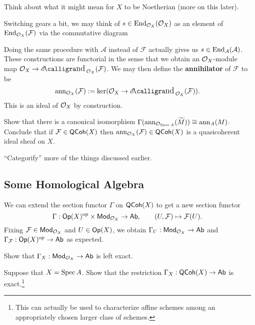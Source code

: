 \documentclass[11pt]{article}
\renewcommand{\AA}{\mathcal{A}}
\renewcommand{\F}{\mathcal{F}}
\begin{document}
\begin{exercise}
Think about what it might mean for $X$ to be Noetherian (more on this later).
\end{exercise}

Switching gears a bit, we may think of $s\in\operatorname{End}_{\mathcal{O}_X}(\mathcal{O}_X)$ as an element of $\End_{\O_X}(\F)$ via the commutative diagram
\begin{center}
\end{center}
Doing the same procedure with $\AA$ instead of $\F$ actually gives us $s\in\End_{\AA}(\AA)$. These constructions are functorial in the sense that we obtain an $\mathcal{O}_X$-module map $\O_X\to\EEnd_{\O_X}(\F)$. We may then define the \textbf{annihilator} of $\F$ to be
$$\ann_{\O_X}(\F):=\ker(\O_X\to\EEnd_{\O_X}(\F)).$$
This is an ideal of $\mathcal{O}_X$ by construction.

\begin{exercise}
Show that there is a canonical isomorphism $\Gamma(\operatorname{ann}_{\mathcal{O}_{\operatorname{Spec} A}}(\widetilde{M}))\cong\operatorname{ann}_A(M)$. Conclude that if $\F\in\QCoh(X)$ then $\ann_{\O_X}(\F)\in\QCoh(X)$ is a quasicoherent ideal sheaf on $X$.
\end{exercise}

\begin{exercise}
``Categorify'' more of the things discussed earlier.
\end{exercise}

\subsection{Some Homological Algebra}
We can extend the section functor $\Gamma$ on $\operatorname{\mathsf{QCoh}}(X)$ to get a new section functor
$$\Gamma: \Op(X)^{\op}\times\Mod_{\O_X}\to\Ab,\qquad (U,\F)\mapsto\F(U).$$
Fixing $\F\in\Mod_{\O_X}$ and $U\in\operatorname{\mathsf{Op}}(X)$, we obtain $\Gamma_U: \operatorname{\mathsf{Mod}}_{\mathcal{O}_X}\to\operatorname{\mathsf{Ab}}$ and $\Gamma_{\F}: \Op(X)^{\op}\to\Ab$ as expected.

\begin{exercise}
\hfill
\begin{enum}{\alph}
\item Show that $\Gamma_X: \operatorname{\mathsf{Mod}}_{\mathcal{O}_X}\to\operatorname{\mathsf{Ab}}$ is left exact.

\item Suppose that $X=\operatorname{Spec} A$. Show that the restriction $\Gamma_X: \operatorname{\mathsf{QCoh}}(X)\to\operatorname{\mathsf{Ab}}$ is exact.\footnote{This can actually be used to characterize affine schemes among an appropriately chosen larger class of schemes.}
\end{enum}
\end{exercise}
\end{document}
